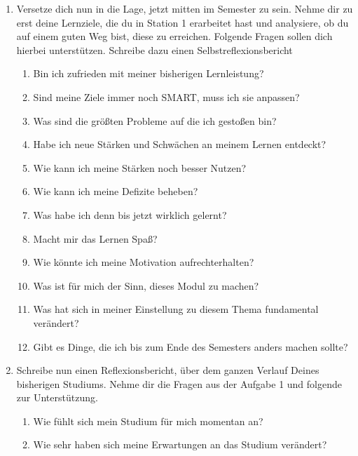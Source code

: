 \documentclass[a4paper,oneside]{scrarticle}
\begin{document}
	\begin{enumerate}
		\item Versetze dich nun in die Lage, jetzt mitten im Semester zu sein. Nehme dir zu erst deine Lernziele, die du in Station 1 erarbeitet hast und analysiere, ob du auf einem guten Weg bist, diese zu erreichen. Folgende Fragen sollen dich hierbei unterstützen. Schreibe dazu einen Selbstreflexionsbericht 
		\begin{enumerate}
			\item Bin ich zufrieden mit meiner bisherigen Lernleistung?
			\item Sind meine Ziele immer noch SMART, muss ich sie anpassen?
			\item Was sind die größten Probleme auf die ich gestoßen bin?
			\item Habe ich neue Stärken und Schwächen an meinem Lernen entdeckt?
			\item Wie kann ich meine Stärken noch besser Nutzen?
			\item Wie kann ich meine Defizite beheben?
			\item Was habe ich denn bis jetzt wirklich gelernt?
			\item Macht mir das Lernen Spaß?
			\item Wie könnte ich meine Motivation aufrechterhalten?
			\item Was ist für mich der Sinn, dieses Modul zu machen?
			\item Was hat sich in meiner Einstellung zu diesem Thema fundamental verändert?
			\item Gibt es Dinge, die ich bis zum Ende des Semesters anders machen sollte?
		\end{enumerate}
		\item Schreibe nun einen Reflexionsbericht, über dem ganzen Verlauf Deines bisherigen Studiums. Nehme dir die Fragen aus der Aufgabe 1 und folgende zur Unterstützung.
		\begin{enumerate}
			\item Wie fühlt sich mein Studium für mich momentan an?
			\item Wie sehr haben sich meine Erwartungen an das Studium verändert?
		\end{enumerate}

	\end{enumerate}
\end{document}
